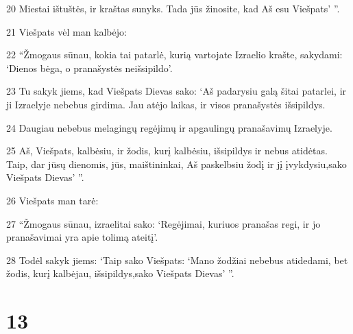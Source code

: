 \par 20 Miestai ištuštės, ir kraštas sunyks. Tada jūs žinosite, kad Aš esu Viešpats’ ”. 
\par 21 Viešpats vėl man kalbėjo: 
\par 22 “Žmogaus sūnau, kokia tai patarlė, kurią vartojate Izraelio krašte, sakydami: ‘Dienos bėga, o pranašystės neišsipildo’. 
\par 23 Tu sakyk jiems, kad Viešpats Dievas sako: ‘Aš padarysiu galą šitai patarlei, ir ji Izraelyje nebebus girdima. Jau atėjo laikas, ir visos pranašystės išsipildys. 
\par 24 Daugiau nebebus melagingų regėjimų ir apgaulingų pranašavimų Izraelyje. 
\par 25 Aš, Viešpats, kalbėsiu, ir žodis, kurį kalbėsiu, išsipildys ir nebus atidėtas. Taip, dar jūsų dienomis, jūs, maištininkai, Aš paskelbsiu žodį ir jį įvykdysiu,­sako Viešpats Dievas’ ”. 
\par 26 Viešpats man tarė: 
\par 27 “Žmogaus sūnau, izraelitai sako: ‘Regėjimai, kuriuos pranašas regi, ir jo pranašavimai yra apie tolimą ateitį’. 
\par 28 Todėl sakyk jiems: ‘Taip sako Viešpats: ‘Mano žodžiai nebebus atidedami, bet žodis, kurį kalbėjau, išsipildys,­sako Viešpats Dievas’ ”.



\chapter{13}


